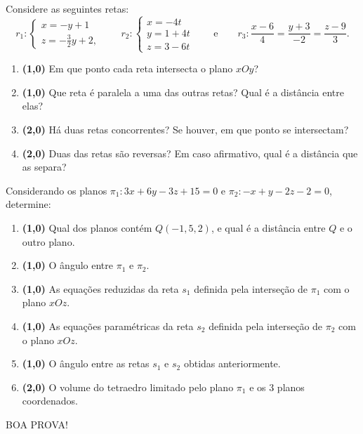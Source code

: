 \documentclass[12pt,a4paper]{article}
\newcommand{\fixme}{{\color{red}(...)}}
\begin{document}
\begin{ExerciseList}
\Exercise%
Considere as seguintes retas:
\[
r_1: \begin{cases}
x=-y+1\\
z=-\frac{3}{2}y+2,
\end{cases}
\qquad
r_2: \begin{cases}
x=-4t\\
y=1+4t\\
z=3-6t
\end{cases}
\qquad\text{e}\qquad
r_3: \dfrac{x-6}{4} = \dfrac{y+3}{-2} = \dfrac{z-9}{3}.
\]
\begin{enumerate}
\item \textbf{(1,0)} Em que ponto cada reta intersecta o plano $xOy$?
\item \textbf{(1,0)} Que reta é paralela a uma das outras retas? Qual é a distância entre elas?
\item \textbf{(2,0)} Há duas retas concorrentes? Se houver, em que ponto se intersectam?
\item \textbf{(2,0)} Duas das retas são reversas? Em caso afirmativo, qual é a distância que as separa?
\end{enumerate}
\Answer \fixme

\Exercise%
Considerando os planos $\pi_1: 3x + 6y - 3z + 15 = 0$ e $\pi_2: -x + y - 2z - 2 = 0$, determine:
\begin{enumerate}
\item \textbf{(1,0)} Qual dos planos contém $Q(-1,5,2)$, e qual é a distância entre $Q$ e o outro plano.
\item \textbf{(1,0)} O ângulo entre $\pi_1$ e $\pi_2$.
\item \textbf{(1,0)} As equações reduzidas da reta $s_1$ definida pela interseção de $\pi_1$ com o plano $xOz$.
\item \textbf{(1,0)} As equações paramétricas da reta $s_2$ definida pela interseção de $\pi_2$ com o plano $xOz$.
\item \textbf{(1,0)} O ângulo entre as retas $s_1$ e $s_2$ obtidas anteriormente.
\item \textbf{(2,0)} O volume do tetraedro limitado pelo plano $\pi_1$ e os $3$ planos coordenados.
\end{enumerate}
\Answer \fixme
\end{ExerciseList}

\begin{center}
BOA PROVA!
\end{center}

\restoregeometry
\end{document}
